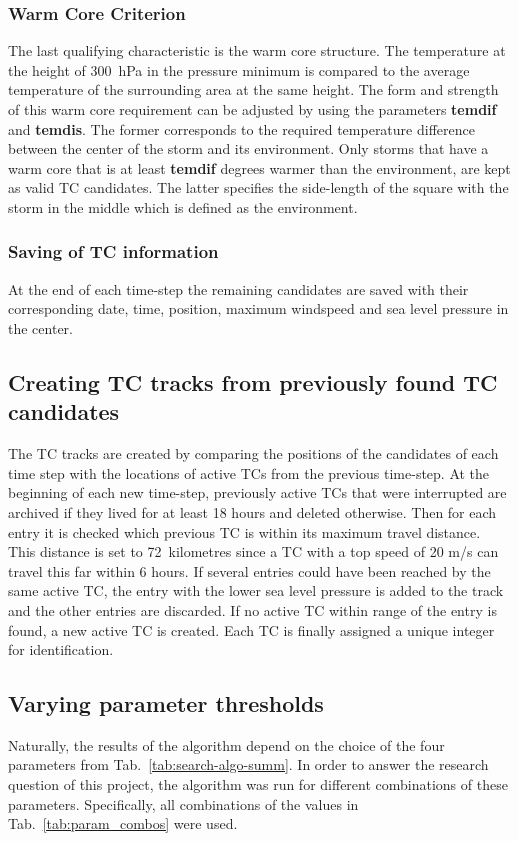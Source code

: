 \subsubsection*{Warm Core Criterion}
The last qualifying characteristic is the warm core structure. The temperature
at the height of 300~hPa in the pressure minimum is compared to the average
temperature of the surrounding area at the same height. The form and strength
of this warm core requirement can be adjusted by using the parameters
\textbf{temdif} and \textbf{temdis}. The former corresponds to the required
temperature difference between the center of the storm and its environment.
Only storms that have a warm core that is at least \textbf{temdif} degrees
warmer than the environment, are kept as valid TC candidates. The latter
specifies the side-length of the square with the storm in the middle which is
defined as the environment.

\subsubsection*{Saving of TC information}
At the end of each time-step the remaining candidates are saved with their
corresponding date, time, position, maximum windspeed and sea level pressure in
the center.

\subsection{Creating TC tracks from previously found TC candidates}
The TC tracks are created by comparing the positions of the candidates of each time step with the locations of active TCs from the previous time-step. At the beginning of each new time-step, previously active TCs that were interrupted are archived if they lived for at
least 18 hours and deleted otherwise. Then for each entry it is checked which
previous TC is within its maximum travel distance. This distance is set to
72~kilometres since a TC with a top speed of 20 m/s can travel this far within
6 hours. If several entries could have been reached by the same active TC, the
entry with the lower sea level pressure is added to the track and the other
entries are discarded. If no active TC within range of the entry is found, a new
active TC is created. Each TC is finally assigned a unique integer for
identification.

\subsection{Varying parameter thresholds}
Naturally, the results of the algorithm depend on the choice of the four
parameters from Tab.~\ref{tab:search-algo-summ}. In order to answer the
research question of this project, the algorithm was run for different
combinations of these parameters. Specifically, all combinations of the values
in Tab.~\ref{tab:param_combos} were used.


